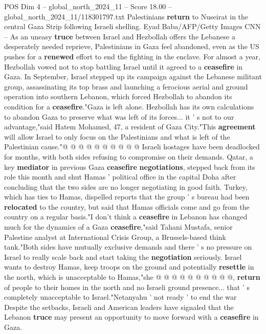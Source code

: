 \begin{textsample}{POS Dim 4 – global\_north\_2024\_11 – Score 18.00 – global\_north\_2024\_11/118301797.txt}  \label{ex:f4_pos_289}
Palestinians \textbf{return} to Nuseirat in the central Gaza Strip following Israeli shelling.
Eyad Baba/AFP/Getty Images CNN -- As an uneasy \textbf{truce} between Israel and Hezbollah offers the Lebanese a desperately needed reprieve, Palestinians in Gaza feel abandoned, even as the US pushes for a \textbf{renewed} effort to end the fighting in the enclave.
For almost a year, Hezbollah vowed not to stop battling Israel until it agreed to a \textbf{ceasefire} in Gaza.
In September, Israel stepped up its campaign against the Lebanese militant group, assassinating its top brass and launching a ferocious aerial and ground operation into southern Lebanon, which forced Hezbollah to abandon its condition for a \textbf{ceasefire}."Gaza is left alone.
Hezbollah has its own calculations to abandon Gaza to preserve what was left of its forces... it ' s not to our advantage,"said Hatem Mohamed, 47, a resident of Gaza City."This \textbf{agreement} will allow Israel to only focus on the Palestinians and what is left of the Palestinian cause."@ @ @ @ @ @ @ @ @ @ Israeli hostages have been deadlocked for months, with both sides refusing to compromise on their demands.
Qatar, a key \textbf{mediator} in previous Gaza \textbf{ceasefire} \textbf{negotiations}, stepped back from its role this month and shut Hamas ' political office in the capital Doha after concluding that the two sides are no longer negotiating in good faith.
Turkey, which has ties to Hamas, dispelled reports that the group ' s bureau had been \textbf{relocated} to the country, but said that Hamas officials come and go from the country on a regular basis."I don't think a \textbf{ceasefire} in Lebanon has changed much for the dynamics of a Gaza \textbf{ceasefire},"said Tahani Mustafa, senior Palestine analyst at International Crisis Group, a Brussels-based think tank."Both sides have mutually exclusive demands and there ' s no pressure on Israel to really scale back and start taking the \textbf{negotiation} seriously.
Israel wants to destroy Hamas, keep troops on the ground and potentially \textbf{resettle} in the north, which is unacceptable to Hamas,"she @ @ @ @ @ @ @ @ @ @, \textbf{return} of people to their homes in the north and no Israeli ground presence... that ' s completely unacceptable to Israel."Netanyahu ' not ready ' to end the war Despite the setbacks, Israeli and American leaders have signaled that the Lebanon \textbf{truce} may present an opportunity to move forward with a \textbf{ceasefire} in Gaza.

\end{textsample}
